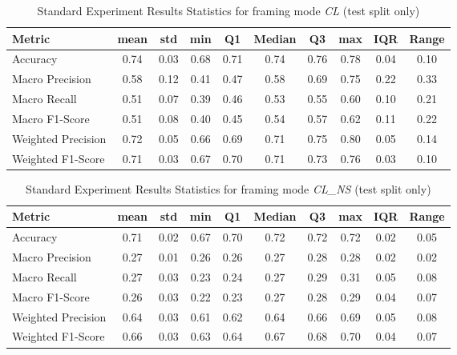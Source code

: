 \begin{table}[h]
\caption{Standard Experiment Results Statistics for framing mode \textit{CL} (test split only)}
\label{tab:cl_Standard_Results_Statistics_test}
\begin{tabular}{|l|c|c|c|c|c|c|c|c|c|}
\toprule
Metric & mean & std & min & Q1 & Median & Q3 & max & IQR & Range \\
\midrule
Accuracy & 0.74 & 0.03 & 0.68 & 0.71 & 0.74 & 0.76 & 0.78 & 0.04 & 0.10 \\
Macro Precision & 0.58 & 0.12 & 0.41 & 0.47 & 0.58 & 0.69 & 0.75 & 0.22 & 0.33 \\
Macro Recall & 0.51 & 0.07 & 0.39 & 0.46 & 0.53 & 0.55 & 0.60 & 0.10 & 0.21 \\
Macro F1-Score & 0.51 & 0.08 & 0.40 & 0.45 & 0.54 & 0.57 & 0.62 & 0.11 & 0.22 \\
Weighted Precision & 0.72 & 0.05 & 0.66 & 0.69 & 0.71 & 0.75 & 0.80 & 0.05 & 0.14 \\
Weighted F1-Score & 0.71 & 0.03 & 0.67 & 0.70 & 0.71 & 0.73 & 0.76 & 0.03 & 0.10 \\
\bottomrule
\end{tabular}
\end{table}

\begin{table}[h]
\caption{Standard Experiment Results Statistics for framing mode \textit{CL\_NS} (test split only)}
\label{tab:cl_ns_Standard_Results_Statistics_test}
\begin{tabular}{|l|c|c|c|c|c|c|c|c|c|}
\toprule
Metric & mean & std & min & Q1 & Median & Q3 & max & IQR & Range \\
\midrule
Accuracy & 0.71 & 0.02 & 0.67 & 0.70 & 0.72 & 0.72 & 0.72 & 0.02 & 0.05 \\
Macro Precision & 0.27 & 0.01 & 0.26 & 0.26 & 0.27 & 0.28 & 0.28 & 0.02 & 0.02 \\
Macro Recall & 0.27 & 0.03 & 0.23 & 0.24 & 0.27 & 0.29 & 0.31 & 0.05 & 0.08 \\
Macro F1-Score & 0.26 & 0.03 & 0.22 & 0.23 & 0.27 & 0.28 & 0.29 & 0.04 & 0.07 \\
Weighted Precision & 0.64 & 0.03 & 0.61 & 0.62 & 0.64 & 0.66 & 0.69 & 0.05 & 0.08 \\
Weighted F1-Score & 0.66 & 0.03 & 0.63 & 0.64 & 0.67 & 0.68 & 0.70 & 0.04 & 0.07 \\
\bottomrule
\end{tabular}
\end{table}

